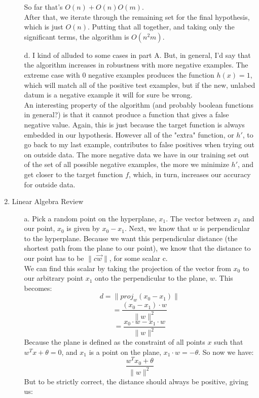 \begin{enumerate}
\begin{enumerate}
			So far that's $O(n) + O(n)O(m)$.\\
			After that, we iterate through the remaining set for the final hypothesis, which is just $O(n)$.
			Putting that all together, and taking only the significant terms, the algorithm is $O(n^2m)$.
		\item[d.]
			I kind of alluded to some cases in part A. But, in general, I'd say that the algorithm increases in robustness with more negative 			 examples. The extreme case with 0 negative examples produces the function $h(x) = 1$, which will match all of the positive test
			examples, but if the new, unlabed datum is a negative example it will for sure be wrong.\\
			An interesting property of the algorithm (and probably boolean functions in general?) is that it cannot produce a function that gives a false negative value.
			Again, this is just because the target function is always embedded in our hypothesis. However all of the "extra" function, or $h'$, to go back to my last 
			example, contributes to false positives when trying out on outside data. The more negative data we have in our training set out of the set of all possible 
			negative examples, the more we minimize $h'$, and get closer to the target function $f$, which, in turn, increases our accuracy for outside data. 
	\end{enumerate}
\item Linear Algebra Review
	\begin{enumerate}
		\item[a.]
			Pick a random point on the hyperplane, $x_1$. The vector between $x_1$ and our point, $x_0$ is given by $x_0-x_1$. Next, we know that $w$ is perpendicular to the hyperplane. Because we want this perpendicular distance (the shortest path from the plane to our point), we know that the distance to our point has to be $\| c\vec{w} \|$, for some scalar c.\\
			We can find this scalar by taking the projection of the vector from $x_0$ to our arbitrary point $x_1$ onto the perpendicular to the plane, $w$. This becomes:\\
			$$d=\|proj_{w}(x_0-x_1)\|$$
			$$=\frac{(x_0-x_1)\cdot w}{\|w\|^2}$$
			$$=\frac{x_0\cdot w - x_1\cdot w}{\|w\|^2}$$
			Because the plane is defined as the constraint of all points $x$ such that $w^Tx+\theta=0$, and $x_1$ is a point on the plane, $x_1\cdot w = -\theta$. So now we have:
			$$\frac{w^T x_0 + \theta}{\|w\|^2}$$
			But to be strictly correct, the distance should always be positive, giving us:

\end{enumerate}
\end{enumerate}
